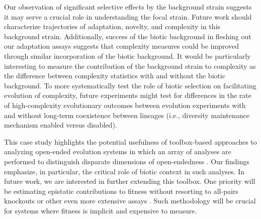 Our observation of significant selective effects by the background strain suggests it may serve a crucial role in understanding the focal strain.
Future work should characterize trajectories of adaptation, novelty, and complexity in this background strain.
Additionally, success of the biotic background in fleshing out our adaptation assays suggests that complexity measures could be improved through similar incorporation of the biotic background.
It would be particularly interesting to measure the contribution of the background strain to complexity as the difference between complexity statistics with and without the biotic background.
To more systematically test the role of biotic selection on facilitating evolution of complexity, future experiments might test for differences in the rate of high-complexity evolutionary outcomes between evolution experiments with and without long-term coexistence between lineages (i.e., diversity maintenance mechanism enabled versus disabled).

This case study highlights the potential usefulness of toolbox-based approaches to analyzing open-ended evolution systems in which an array of analyses are performed to distinguish disparate dimensions of open-endedness \citep{dolson2019modes}.
Our findings emphasize, in particular, the critical role of biotic context in such analyses.
In future work, we are interested in further extending this toolbox.
One priority will be estimating epistatic contributions to fitness without resorting to all-pairs knockouts or other even more extensive assays \citep{moreno2024methods}.
Such methodology will be crucial for systems where fitness is implicit and expensive to measure.









